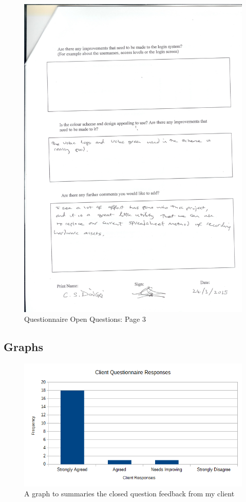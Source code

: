 \begin{figure}[H]
    \includegraphics[width=\textwidth]{./Evaluation/EvaluationQuestionnaire/Scan14.jpeg}
    \caption{Questionnaire Open Questions: Page 3} \label{fig:q3}
\end{figure}

\subsection{Graphs}

\begin{figure}[H]
    \includegraphics[width=\textwidth]{./Evaluation/EvaluationQuestionnaire/graph.png}
    \caption{A graph to summaries the closed question feedback from my client} \label{graph}
\end{figure}

